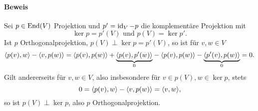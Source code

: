 \paragraph{Beweis}
	Sei $ p\in \operatorname{End}(V) $ Projektion und $ p' = \operatorname{id}_V - p $ die komplementäre Projektion mit
		\[ \ker p = p'(V) \text{ und } p(V) = \ker p'. \]
	Ist $ p $ Orthogonalprojektion, $ p(V)\perp \ker p = p'(V) $, so ist für $ v,w\in V $
		\[ \langle p(v),w \rangle-\langle v,p(w) \rangle = \langle p(v),p(w) \rangle+\underset{0}{\underbrace{\langle p(v),p'(w) \rangle}} - \langle p(v),p(w) \rangle-\underset{0}{\underbrace{\langle p'(v),p(w) \rangle}} = 0. \]
	Gilt andererseits für $ v,w\in V $, also insbesondere für $ v\in p(V), w\in \ker p $, stets
		\[ 0 = \langle p(v),w \rangle-\langle v,p(w) \rangle = \langle v,w \rangle, \]
	so ist $ p(V)\perp \ker p $, also $ p $ Orthogonalprojektion.